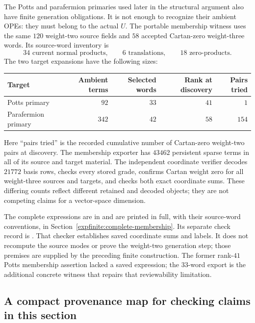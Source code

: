 The Potts and parafermion primaries used later in the structural argument
also have finite generation obligations. It is not enough to recognize
their ambient OPEs: they must belong to the actual $U$. The portable
membership witness uses the same $120$ weight-two source fields and
$58$ accepted Cartan-zero weight-three words. Its source-word inventory
is
\[
34\text{ current normal products},\qquad
6\text{ translations},\qquad18\text{ zero-products}.
\]
The two target expansions have the following sizes:
\begin{center}\small
\begin{tabular}{@{}lrrrr@{}}
\toprule
Target&Ambient terms&Selected words&Rank at discovery&Pairs tried\\\midrule
Potts primary&$92$&$33$&$41$&$1$\\
Parafermion primary&$342$&$42$&$58$&$154$\\\bottomrule
\end{tabular}
\end{center}
Here ``pairs tried'' is the recorded cumulative number of Cartan-zero
weight-two pairs at discovery. The membership exporter has $43462$
persistent sparse terms in all of its source and target material.
The independent coordinate verifier decodes $21772$ basis rows,
checks every stored grade, confirms Cartan weight zero for all
weight-three sources and targets, and checks both exact coordinate sums.
These differing counts reflect different retained and decoded objects;
they are not competing claims for a vector-space dimension.

The complete expressions are in
and are printed in full, with their source-word conventions, in
Section~\ref{expfinite:complete-membership}. Its separate check record is
.
That checker establishes saved coordinate sums and labels. It does not
recompute the source modes or prove the weight-two generation step;
those premises are supplied by the preceding finite construction.
The former rank-$41$ Potts membership assertion lacked a saved expression;
the $33$-word export is the additional concrete witness that repairs
that reviewability limitation.

\subsection{A compact provenance map for checking claims in this section}
\label{expfinite:provenance}

